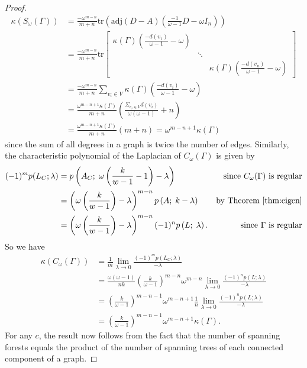 \documentclass[12pt]{report}
\theoremstyle{definition}
\begin{document}
\begin{proof}
        \begin{align*}
        \kappa(S_\omega(\Gamma))&= \frac{-\omega^{m-n}}{m+n}\text{tr}\left(\text{adj}(D-A) \left(\frac{-1}{\omega -1}D -\omega I_n\right)\right) \\
        &= \frac{-\omega^{m-n}}{m+n}\text{tr}\begin{bmatrix} \kappa(\Gamma)\left(\frac{-d(v_1)}{\omega -1}-\omega\right)  & &  \\
        & \ddots & \\
        & & \kappa(\Gamma)\left(\frac{-d(v_n)}{\omega -1}-\omega\right)
        \end{bmatrix} \\
        &= \frac{-\omega^{m-n}}{m+n}\sum_{v_i\in V} \kappa(\Gamma)\left(\frac{-d(v_i)}{\omega -1}-\omega\right) \\
        &= \frac{\omega^{m-n+1}\kappa(\Gamma)}{m+n}\left(\frac{\Sigma_{v_i\in V} d(v_i)}{\omega(\omega -1)}+n\right) \\
        &= \frac{\omega^{m-n+1}\kappa(\Gamma)}{m+n}\left(m+n\right) = \omega^{m-n+1}\kappa(\Gamma)
    \end{align*}
    since the sum of all degrees in a graph is twice the number of edges. Similarly, the characteristic polynomial of the Laplacian of $C_\omega(\Gamma)$ is given by
    \begin{align*}
        (-1)^mp(L_C;\lambda) &= p\left(A_C;\;\omega \left(\frac{k}{w-1}-1 \right) -\lambda\right) & \mbox{since $C_\omega(\Gamma)$ is regular}\\
        &= \left( \omega \left(\frac{k}{w-1} \right) -\lambda \right)^{m-n}p\left(A;\; k -\lambda\right) & \mbox{by Theorem \ref{thm:eigen}}\\
        &= \left( \omega \left(\frac{k}{w-1} \right) -\lambda \right)^{m-n}(-1)^n p\left(L;\;\lambda\right). & \mbox{since $\Gamma$ is regular}
    \end{align*}
    So we have 
    \begin{align*}
        \kappa(C_\omega(\Gamma)) &= \frac{1}{m} \lim_{\lambda \to 0}\frac{(-1)^{m}p(L_C;\lambda)}{-\lambda} \\
        &= \frac{\omega(\omega -1)}{nk} \left(\frac{k}{\omega -1} \right) ^{m-n}\omega^{m-n} \lim_{\lambda \to 0}\frac{(-1)^{n}p(L;\lambda)}{-\lambda} \\
        &= \left(\frac{k}{\omega -1} \right) ^{m-n-1}\omega^{m-n+1} \frac{1}{n}\lim_{\lambda \to 0}\frac{(-1)^{n}p(L;\lambda)}{-\lambda} \\
        &= \left(\frac{k}{\omega -1} \right) ^{m-n-1}\omega^{m-n+1} \kappa(\Gamma).
    \end{align*}
    For any $c$, the result now follows from the fact that the number of spanning forests equals the product of the number of spanning trees of each connected component of a graph. 
\end{proof}
\end{document}
